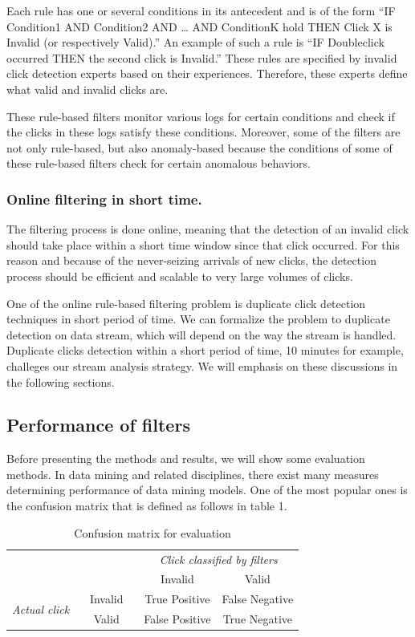 \documentclass[runningheads,report]{llncs}
\begin{document}
Each rule has one or several conditions in its antecedent and is of the form “IF Condition1 AND Condition2 AND … AND ConditionK hold THEN Click X is Invalid (or respectively Valid).” An example of such a rule is “IF Doubleclick occurred THEN the second click is Invalid.” These rules are specified by invalid click detection experts based on their experiences. Therefore, these experts define what valid and invalid clicks are.

These rule-based filters  monitor various logs for certain conditions and check if the clicks in these logs satisfy these conditions. Moreover, some of the filters are not only rule-based, but also anomaly-based because the conditions of some of these rule-based filters check for certain anomalous behaviors.  

\subsubsection{Online filtering in short time.}

The filtering process is done online, meaning that the detection of an invalid click should take place within a short time window since that click occurred. For this reason and because of the never-seizing arrivals of new clicks, the detection process should be efficient and scalable to very large volumes of clicks.  

One of the online rule-based filtering problem is duplicate click detection techniques in short period of time. We can formalize the problem to duplicate detection on data stream, which will depend on the way the stream is handled.  Duplicate clicks detection within a short period of time, 10 minutes for example,  challeges our stream analysis strategy.  We will emphasis on these discussions in the following sections.



\subsection{Performance of filters}

Before presenting the methods and results,  we will show some evaluation methods. In data mining and related disciplines, there exist many measures determining performance of data mining models. One of the most popular ones is the confusion matrix that is defined as follows in table 1.

 \begin{table}[htbp]
\centering
\caption{Confusion matrix for evaluation}
\begin{tabular}{cc|c|c}
\cline{3-4}
\multirow{2}{*}{} & \multirow{2}{*}{ } &  \multicolumn{2}{|c}{\emph{Click classified by filters}} \\
\cline{3-4}
& & Invalid & Valid \\
\hline
\multirow{2}{*}{\emph{Actual click} \ } &  \multicolumn{1}{c|}{Invalid \ }  &  \multicolumn{1}{|c}{True Positive}  &  \multicolumn{1}{|c}{False Negative} \\
\cline{2-4}
 &  Valid \  & False Positive  &  True Negative \\
\hline
\end{tabular}
\end{table}
\end{document}

